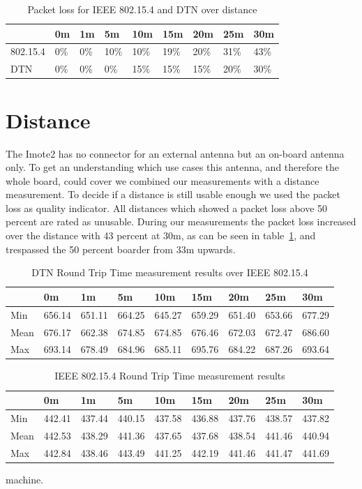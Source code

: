 \begin{table}
\begin{tabular}{lllllllll}
    & 0m & 1m & 5m & 10m & 15m & 20m & 25m & 30m \\
\hline
802.15.4 & 0\% & 0\% & 10\% & 10\% & 19\% & 20\% & 31\% & 43\% \\
DTN & 0\% & 0\% & 0\% & 15\% & 15\% & 15\% & 20\% & 30\% \\
\end{tabular}
\caption{Packet loss for IEEE 802.15.4 and DTN over distance}
\label{tableloss}
\end{table}

\section{Distance}
The Imote2 has no connector for an external antenna but an on-board antenna
only. To get an understanding which use cases this antenna, and therefore the
whole board, could cover we combined our measurements with a distance
measurement. To decide if a distance is still usable enough we used the
packet loss as quality indicator. All distances which showed a packet loss above
50 percent are rated as unusable. During our measurements the packet loss
increased over the distance with 43 percent at 30m, as can be seen in table~\ref{tableloss}, and trespassed the 50 percent boarder from 33m upwards.

\begin{table}
\begin{tabular}{lllllllll}
    & 0m & 1m & 5m & 10m & 15m & 20m & 25m & 30m \\
\hline
Min & 656.14 & 651.11 & 664.25 & 645.27 & 659.29 & 651.40 & 653.66 & 677.29 \\
Mean & 676.17 & 662.38 & 674.85 & 674.85 & 676.46 & 672.03 & 672.47 & 686.60 \\
Max & 693.14 & 678.49 & 684.96 & 685.11 & 695.76 & 684.22 & 687.26 & 693.64 \\
\end{tabular}
\caption{DTN Round Trip Time measurement results over IEEE 802.15.4}
\label{dtnrtt}
\end{table}

\begin{table}
\begin{tabular}{lllllllll}
    & 0m & 1m & 5m & 10m & 15m & 20m & 25m & 30m \\
\hline
Min & 442.41 & 437.44 & 440.15 & 437.58 & 436.88 & 437.76 & 438.57 & 437.82 \\
Mean & 442.53 & 438.29 & 441.36 & 437.65 & 437.68 & 438.54 & 441.46 & 440.94 \\
Max & 442.84 & 438.46 & 443.49 & 441.25 & 442.19 & 441.46 & 441.47 & 441.69 \\
\end{tabular}
\caption{IEEE 802.15.4 Round Trip Time measurement results}
\label{802154rtt}
\end{table}
machine.

